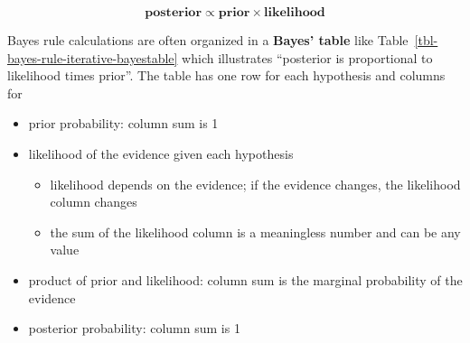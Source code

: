 \documentclass[
  letterpaper,
  DIV=11,
  numbers=noendperiod]{scrreprt}
\providecommand{\tightlist}{%
  \setlength{\itemsep}{0pt}\setlength{\parskip}{0pt}}
\theoremstyle{plain}
\theoremstyle{definition}
\theoremstyle{definition}
\theoremstyle{definition}
\theoremstyle{remark}
\begin{document}
\[
\textbf{posterior} \propto \textbf{prior} \times \textbf{likelihood}
\]

Bayes rule calculations are often organized in a \textbf{Bayes' table}
like Table~\ref{tbl-bayes-rule-iterative-bayestable} which illustrates
``posterior is proportional to likelihood times prior''. The table has
one row for each hypothesis and columns for

\begin{itemize}
\tightlist
\item
  prior probability: column sum is 1
\item
  likelihood of the evidence given each hypothesis

  \begin{itemize}
  \tightlist
  \item
    likelihood depends on the evidence; if the evidence changes, the
    likelihood column changes
  \item
    the sum of the likelihood column is a meaningless number and can be
    any value
  \end{itemize}
\item
  product of prior and likelihood: column sum is the marginal
  probability of the evidence
\item
  posterior probability: column sum is 1
\end{itemize}

\begin{table}

\caption{\label{tbl-bayes-rule-iterative-bayestable}Bayes table
representation of the posterior probabilities of each opinion about the
scientific method (the hypotheses) given a postgraduate degree (the
evidence) in Example~\ref{exm-bayes-rule-iterative-bayestable}}


\end{table}%
\end{document}
